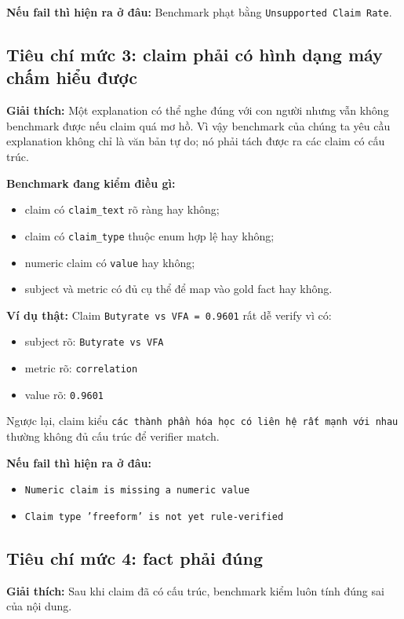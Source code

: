 \documentclass[11pt,a4paper]{article}
\newcommand{\field}[1]{\texttt{#1}}
\begin{document}
\textbf{Nếu fail thì hiện ra ở đâu:}
Benchmark phạt bằng \field{Unsupported Claim Rate}.

\subsection{Tiêu chí mức 3: claim phải có hình dạng máy chấm hiểu được}
\textbf{Giải thích:}
Một explanation có thể nghe đúng với con người nhưng vẫn không benchmark được nếu claim quá mơ hồ.
Vì vậy benchmark của chúng ta yêu cầu explanation không chỉ là văn bản tự do; nó phải tách được ra các claim có cấu trúc.

\textbf{Benchmark đang kiểm điều gì:}
\begin{itemize}
  \item claim có \field{claim\_text} rõ ràng hay không;
  \item claim có \field{claim\_type} thuộc enum hợp lệ hay không;
  \item numeric claim có \field{value} hay không;
  \item subject và metric có đủ cụ thể để map vào gold fact hay không.
\end{itemize}

\textbf{Ví dụ thật:}
Claim
\field{Butyrate vs VFA = 0.9601}
rất dễ verify vì có:
\begin{itemize}
  \item subject rõ: \field{Butyrate vs VFA}
  \item metric rõ: \field{correlation}
  \item value rõ: \field{0.9601}
\end{itemize}

Ngược lại, claim kiểu
\field{các thành phần hóa học có liên hệ rất mạnh với nhau}
thường không đủ cấu trúc để verifier match.

\textbf{Nếu fail thì hiện ra ở đâu:}
\begin{itemize}
  \item \field{Numeric claim is missing a numeric value}
  \item \field{Claim type 'freeform' is not yet rule-verified}
\end{itemize}

\subsection{Tiêu chí mức 4: fact phải đúng}
\textbf{Giải thích:}
Sau khi claim đã có cấu trúc, benchmark kiểm luôn tính đúng sai của nội dung.
\end{document}
